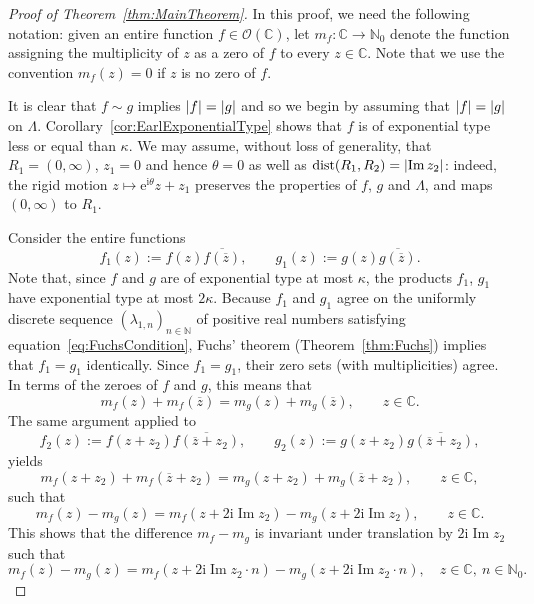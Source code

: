 \documentclass{article}
\newcommand{\bbC}{\mathbb{C}}
\newcommand{\bbN}{\mathbb{N}}
\newcommand{\calO}{\mathcal{O}}
\newcommand{\rme}{\mathrm{e}}
\newcommand{\rmi}{\mathrm{i}}
\DeclarePairedDelimiter{\abs}{\lvert}{\rvert}
\renewcommand{\Im}{\operatorname{Im}}
\theoremstyle{remark}
\begin{document}
    \begin{proof}[Proof of Theorem~\ref{thm:MainTheorem}]
        In this proof, we need the following notation: given an entire function $f \in \calO(\bbC)$, let $m_f : \bbC \to \bbN_0$ denote the function assigning the multiplicity of $z$ as a zero of $f$ to every $z \in \bbC$. Note that we use the convention $m_f(z) = 0$ if $z$ is no zero of $f$.

        It is clear that $f \sim g$ implies $\abs{f} = \abs{g}$ and so we begin by assuming that $\abs{f} = \abs{g}$ on $\Lambda$. Corollary~\ref{cor:EarlExponentialType} shows that $f$ is of exponential type less or equal than $\kappa$. We may assume, without loss of generality, that $R_1 = (0,\infty)$, $z_1 = 0$ and hence $\theta = 0$ as well as $\mathrm{dist}(R_1, R_2) = \abs{\Im z_2}$: indeed, the rigid motion $z \mapsto \rme^{\rmi\theta} z + z_1$ preserves the properties of $f$, $g$ and $\Lambda$, and maps $(0,\infty)$ to $R_1$.
        
        Consider the entire functions 
        \begin{equation*}
            f_1(z) := f(z) \overline{ f(\overline z) }, \qquad g_1(z) := g(z) \overline{ g(\overline z) }.
        \end{equation*}
        Note that, since $f$ and $g$ are of exponential type at most $\kappa$, the products $f_1$, $g_1$ have exponential type at most $2 \kappa$. Because $f_1$ and $g_1$ agree on the uniformly discrete sequence $(\lambda_{1,n})_{n\in\mathbb N}$ of positive real numbers satisfying equation~\eqref{eq:FuchsCondition}, Fuchs' theorem (Theorem~\ref{thm:Fuchs}) implies that $f_1 = g_1$ identically. Since $f_1 = g_1$, their zero sets (with multiplicities) agree. In terms of the zeroes of $f$ and $g$, this means that 
        \begin{equation*}
            m_f(z) + m_f(\overline z) = m_g(z) + m_g(\overline z), \qquad z \in \bbC.
        \end{equation*}
        The same argument applied to 
        \begin{equation*}
            f_2(z) := f(z + z_2) \overline{ f(\overline z + z_2) }, \qquad g_2(z) := g(z + z_2) \overline{ g(\overline z + z_2) },
        \end{equation*}
        yields 
        \begin{equation*}
            m_f(z + z_2) + m_f(\overline z + z_2) = m_g(z + z_2) + m_g(\overline z + z_2), \qquad z \in \bbC,
        \end{equation*}
        such that 
        \begin{equation*}
            m_f(z) - m_g(z) = m_f(z + 2 \rmi \Im z_2) - m_g(z + 2 \rmi \Im z_2), \qquad z \in \bbC.
        \end{equation*}
        This shows that the difference $m_f - m_g$ is invariant under translation by $2 \rmi \Im z_2$ such that 
        \begin{equation*}
            m_f(z) - m_g(z) = m_f(z + 2 \rmi \Im z_2 \cdot n) - m_g(z + 2 \rmi \Im z_2 \cdot n), \quad z \in \bbC,~n \in \bbN_0.
        \end{equation*}


\end{proof}
\end{document}
